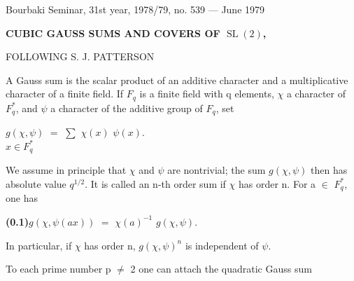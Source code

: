 \documentclass[10pt,a4paper]{article}
\begin{document}
\fontsize{7.35pt}{8.45pt}\selectfont


\label{d035-physical-001}

\begin{center}
{\small Bourbaki Seminar, 31st year, 1978/79, no. 539 --- June 1979}\par
\vspace{0.55em}
{\Large\bfseries CUBIC GAUSS SUMS AND COVERS OF $\operatorname{SL}(2)$,\par
FOLLOWING S. J. PATTERSON}\par
{}\par
\end{center}
\par\medskip{}\par\smallskip
\par A Gauss sum is the scalar product of an additive character and a multiplicative character of a finite field. If $F_q$ is a finite field with q elements, $\chi{}$ a character of $F_q^*$, and $\psi{}$ a character of the additive group of $F_q$, set\par
\par\smallskip\begin{center}\begin{minipage}{0.96\textwidth}\centering
$g(\chi{},\psi{})$ $=$ $\sum{}$ $\chi{}(x)$ $\psi{}(x)$. \\ $x\in{}F_q^*$
\end{minipage}\end{center}\smallskip
\par We assume in principle that $\chi{}$ and $\psi{}$ are nontrivial; the sum $g(\chi{},\psi{})$ then has absolute value $q^{1/2}$. It is called an n-th order sum if $\chi{}$ has order n. For a $\in{}$ $F_q^*$, one has\par
\par\noindent\textbf{(0.1)}\quad $g(\chi{},\psi{}(ax))$ $=$ $\chi{}(a)^{-1}$ $g(\chi{},\psi{})$.\par
\par In particular, if $\chi{}$ has order n, $g(\chi{},\psi{})^n$ is independent of $\psi{}$.\par
\par To each prime number p $\ne{}$ 2 one can attach the quadratic Gauss sum\par
\end{document}

